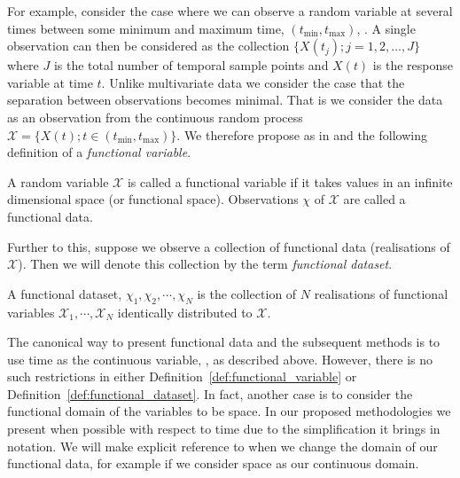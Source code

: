For example, \citeauthor{ferraty_nonparametric_2006} consider the case where we can observe a random variable at several times between some minimum and maximum time, $\left( t_{\text{min}}, t_{\text{max}} \right)$, \citep{ferraty_nonparametric_2006}.
A single observation can then be considered as the collection $ \{ X(t_j) ; j=1,2,\dots, J\}$ where $J$ is the total number of temporal sample points and $X(t)$ is the response variable at time $t$.
Unlike multivariate data we consider the case that the separation between observations becomes minimal.
That is we consider the data as an observation from the continuous random process $\mathcal{X} = \{X(t); t \in \left( t_\text{min}, t_\text{max} \right)\}$.
We therefore propose as in \citep{ferraty_nonparametric_2006} and \citep{shi_gaussian_2011} the following definition of a \textit{functional variable}.

 \begin{definition}
	A random variable $\mathcal{X}$ is called a functional variable if it takes values in an infinite dimensional space (or functional space). Observations $\chi$ of $\mathcal{X}$ are called a functional data.
	\label{def:functional_variable}
\end{definition}

Further to this, suppose we observe a collection of functional data (realisations of $\mathcal{X}$).
Then we will denote this collection by the term \textit{functional dataset}.

\begin{definition}
	A functional dataset, $\chi_1, \chi_2, \cdots, \chi_N$ is the collection of $N$ realisations of functional variables $\mathcal{X}_1, \cdots, \mathcal{X}_N$ identically distributed to $\mathcal{X}$.
	\label{def:functional_dataset}
\end{definition}

The canonical way to present functional data and the subsequent methods is to use time as the continuous variable, \cite{ramsay_functional_2010, ferraty_nonparametric_2006, shi_gaussian_2011}, as described above.
However, there is no such restrictions in either Definition~\ref{def:functional_variable} or Definition~\ref{def:functional_dataset}. 
In fact, another case is to consider the functional domain of the variables to be space.
In our proposed methodologies we present when possible with respect to time due to the simplification it brings in notation.
We will make explicit reference to when we change the domain of our functional data, for example if we consider space as our continuous domain. 

